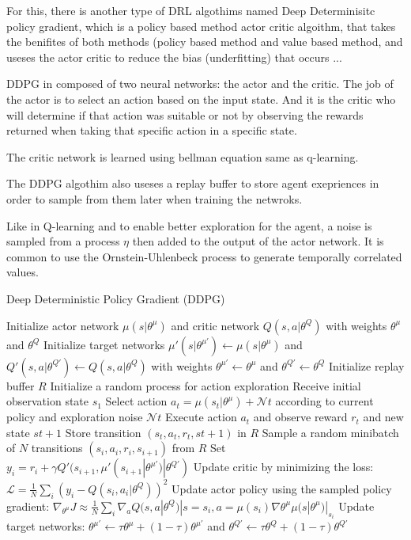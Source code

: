 \documentclass[12pt]{extarticle}
\begin{document}
For this, there is another type of DRL algothims named Deep Determinisitc policy gradient, which is a policy based method actor critic algoithm, that takes the benifites of both methods (policy based method and value based method, and useses the actor critic to reduce the bias (underfitting) that occurs ...

DDPG in  composed  of two neural networks: the actor and the critic. The job of the actor is to select an action based on the input state. And it is the critic who will determine if that action was suitable or not by observing the rewards  returned when taking that specific action in a specific state.

The critic network is  learned using bellman equation same as q-learning.

The DDPG algothim also useses a replay buffer to store agent exepriences
in order to sample from them later when training the netwroks.

Like in Q-learning and to enable better exploration for the agent, a noise 
is sampled from a process $\eta$  then added to the output of the actor network. It is common to use the Ornstein-Uhlenbeck process to generate temporally correlated values.\cite{lillicrap2015continuous}





 
\begin{algorithm}[H]
\caption{Deep Deterministic Policy Gradient (DDPG)}
\label{alg:ddpg}
\begin{algorithmic}[1]
\State Initialize actor network $\mu(s|\theta^\mu)$ and critic network $Q(s,a|\theta^Q)$ with weights $\theta^\mu$ and $\theta^Q$
\State Initialize target networks $\mu'(s|\theta^{\mu'}) \leftarrow \mu(s|\theta^\mu)$ and $Q'(s,a|\theta^{Q'}) \leftarrow Q(s,a|\theta^Q)$ with weights $\theta^{\mu'} \leftarrow \theta^\mu$ and $\theta^{Q'} \leftarrow \theta^Q$
\State Initialize replay buffer $R$
\State Initialize a random process for action exploration
\State Receive initial observation state $s_1$
\State Select action $a_t = \mu(s_t|\theta^\mu) + \mathcal{N}t$ according to current policy and exploration noise $\mathcal{N}t$
\State Execute action $a_t$ and observe reward $r_t$ and new state $s{t+1}$
\State Store transition $(s_t, a_t, r_t, s{t+1})$ in $R$
\State Sample a random minibatch of $N$ transitions $(s_i, a_i, r_i, s_{i+1})$ from $R$
\State Set $y_i = r_i + \gamma Q'(s_{i+1},\mu'(s_{i+1}|\theta^{\mu'})|\theta^{Q'})$
\State Update critic by minimizing the loss: $\mathcal{L} = \frac{1}{N}\sum_i(y_i - Q(s_i,a_i|\theta^Q))^2$
\State Update actor policy using the sampled policy gradient: $\nabla_{\theta^\mu} J \approx \frac{1}{N}\sum_i \nabla_a Q(s,a|\theta^Q)|{s=s_i,a=\mu(s_i)} \nabla{\theta^\mu} \mu(s|\theta^\mu)|_{s_i}$
\State Update target networks: $\theta^{\mu'} \leftarrow \tau \theta^\mu + (1-\tau)\theta^{\mu'}$ and $\theta^{Q'} \leftarrow \tau \theta^Q + (1-\tau)\theta^{Q'}$
\EndFor
\EndFor
\end{algorithmic}
\end{algorithm}
\end{document}
